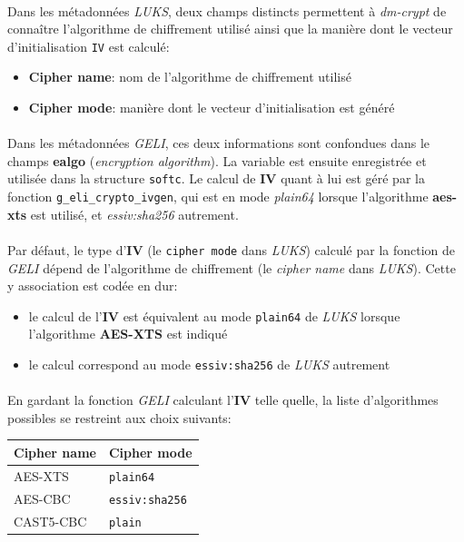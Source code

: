 \paragraph{}
Dans les métadonnées \textit{LUKS}, deux champs distincts permettent à
\textit{dm-crypt} de connaître l'algorithme de chiffrement utilisé ainsi que la
manière dont le vecteur d'initialisation \texttt{IV} est calculé:
\begin{itemize}
\item \textbf{Cipher name}: nom de l'algorithme de chiffrement utilisé
\item \textbf{Cipher mode}: manière dont le vecteur d'initialisation est généré
\end{itemize}
\paragraph{}
Dans les métadonnées \textit{GELI}, ces deux informations sont confondues dans
le champs \textbf{ealgo} (\textit{encryption algorithm}). La variable est
ensuite enregistrée et utilisée dans la structure \texttt{softc}. Le calcul de
\textbf{IV} quant à lui est géré par la fonction \texttt{g\_eli\_crypto\_ivgen},
qui est en mode \textit{plain64} lorsque l'algorithme \textbf{aes-xts} est
utilisé, et \textit{essiv:sha256} autrement.
\paragraph{}
Par défaut, le type d'\textbf{IV} (le \texttt{cipher mode} dans \textit{LUKS})
calculé par la fonction de \textit{GELI} dépend de l'algorithme de chiffrement
(le \textit{cipher name} dans \textit{LUKS}). Cette y association est codée en
dur:
\begin{itemize}
\item le calcul de l'\textbf{IV} est équivalent au mode \texttt{plain64} de
  \textit{LUKS} lorsque l'algorithme \textbf{AES-XTS} est indiqué
\item le calcul correspond au mode \texttt{essiv:sha256} de \textit{LUKS}
  autrement
\end{itemize}
\paragraph{}
En gardant la fonction \textit{GELI} calculant l'\textbf{IV} telle quelle, la
liste d'algorithmes possibles se restreint aux choix suivants:
\begin{center}
  \begin{tabular}{ | l | l | }
    \hline
    \textbf{Cipher name} & \textbf{Cipher mode}  \\
    \hline
    AES-XTS              & \texttt{plain64}      \\
    AES-CBC              & \texttt{essiv:sha256} \\
    CAST5-CBC            & \texttt{plain}        \\
    \hline
  \end{tabular}
\end{center}
